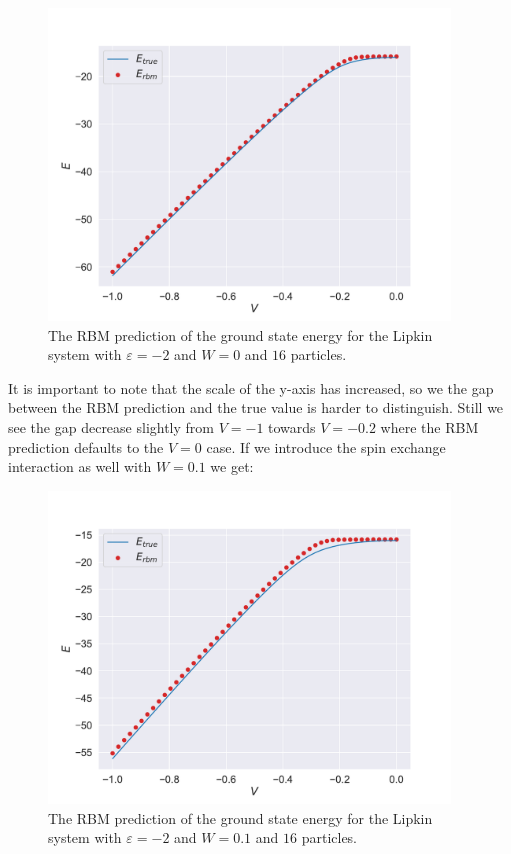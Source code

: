 \begin{figure}[H]
  \begin{center}
    \includegraphics[width=0.95\textwidth]{Figures/Plots/Lipkin/val-true[V][-1.0-0.0][e=850][n=16][eps=-2][W=0].pdf}
  \end{center}
  \caption{The RBM prediction of the ground state energy for the Lipkin system with $\varepsilon=-2$ and $W=0$ and $16$ particles.}
\end{figure}

It is important to note that the scale of the y-axis has increased, so we the gap between the RBM prediction and the true value is harder to distinguish. Still we see the gap decrease slightly from $V=-1$ towards $V=-0.2$ where the RBM prediction defaults to the $V=0$ case. If we introduce the spin exchange interaction as well with $W=0.1$ we get:

\begin{figure}[H]
  \begin{center}
    \includegraphics[width=0.95\textwidth]{Figures/Plots/Lipkin/val-true[V][-1.0-0.0][e=850][n=16][eps=-2][W=0.1].pdf}
  \end{center}
  \caption{The RBM prediction of the ground state energy for the Lipkin system with $\varepsilon=-2$ and $W=0.1$ and $16$ particles.}
\end{figure}

